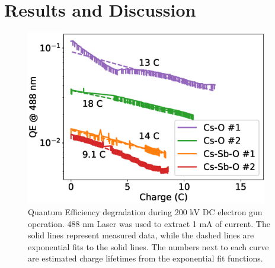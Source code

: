 \section{Results and Discussion}

\begin{figure}
	\centering
	\includegraphics*[width=300pt]{figs/heracles/lifetime.eps}
	\caption{Quantum Efficiency degradation during 200 kV DC electron gun operation. 488 nm Laser was used to extract 1 mA of current. The solid lines represent measured data, while the dashed lines are exponential fits to the solid lines. The numbers next to each curve are estimated charge lifetimes from the exponential fit functions.}
	\label{fig_lifetime22}
\end{figure}


